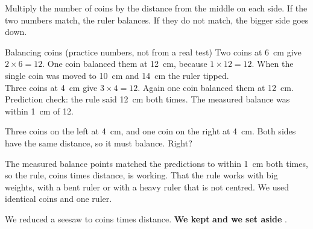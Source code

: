 Multiply the number of coins by the distance from the middle on each side. If the two numbers match, the ruler balances. If they do not match, the bigger side goes down.

\begin{center}
\end{center}

\begin{worked}{Balancing coins (practice numbers, not from a real test)}
Two coins at 6~cm give $2\times6=12$. One coin balanced them at 12~cm, because $1\times12=12$. When the single coin was moved to 10~cm and 14~cm the ruler tipped.\\
Three coins at 4~cm give $3\times4=12$. Again one coin balanced them at 12~cm.\\
Prediction check: the rule said 12~cm both times. The measured balance was within 1~cm of 12.
\end{worked}

\begin{multix}[hmm]\multixbot[hmm]\tcblower
Three coins on the left at 4~cm, and one coin on the right at 4~cm. Both sides have the same distance, so it must balance. Right?
\end{multix}

{The measured balance points matched the predictions to within 1~cm both times, so the rule, coins times distance, is working.}
{That the rule works with big weights, with a bent ruler or with a heavy ruler that is not centred. We used identical coins and one ruler.}

\begin{keepbox}
We reduced a seesaw to coins times distance. \textbf{We kept} \wline[3.4cm] \textbf{and we set aside} \wline[3.4cm].
\end{keepbox}

